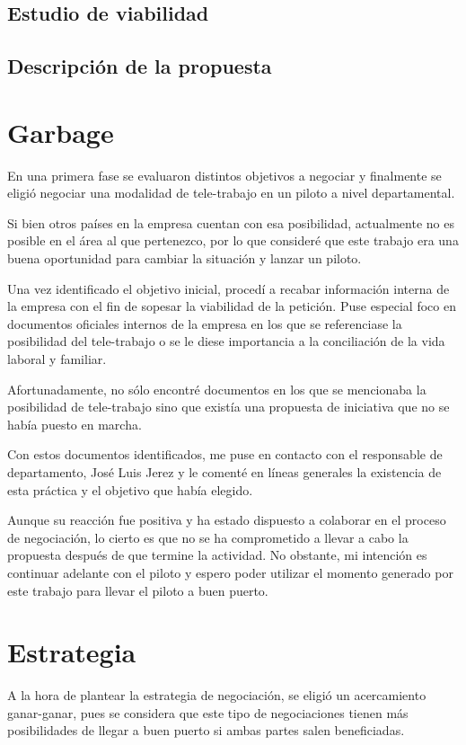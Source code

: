 \subsection{Estudio de viabilidad}
\shit

\subsection{Descripción de la propuesta}
\shit




\section{Garbage}
\par En una primera fase se evaluaron distintos objetivos a negociar y finalmente se eligió negociar una modalidad de tele-trabajo en un piloto a nivel departamental.
\par Si bien otros países en la empresa cuentan con esa posibilidad, actualmente no es posible en el área al que pertenezco, por lo que consideré que este trabajo
era una buena oportunidad para cambiar la situación y lanzar un piloto.
\par Una vez identificado el objetivo inicial, procedí a recabar información interna de la empresa con el fin de sopesar la viabilidad de la petición. Puse especial
foco en documentos oficiales internos de la empresa en los que se referenciase la posibilidad del tele-trabajo o se le diese importancia a la conciliación de la
vida laboral y familiar.
\par Afortunadamente, no sólo encontré documentos en los que se mencionaba la posibilidad de tele-trabajo sino que existía una propuesta de iniciativa que no se
había puesto en marcha.
\par Con estos documentos identificados, me puse en contacto con el responsable de departamento, José Luis Jerez y le comenté en líneas generales la existencia de
esta práctica y el objetivo que había elegido.
\par Aunque su reacción fue positiva y ha estado dispuesto a colaborar en el proceso de negociación, lo cierto es que no se ha comprometido a llevar a cabo la
propuesta después de que termine la actividad. No obstante, mi intención es continuar adelante con el piloto y espero poder utilizar el momento generado
por este trabajo para llevar el piloto a buen puerto.

\section{Estrategia}
\par A la hora de plantear la estrategia de negociación, se eligió un acercamiento ganar-ganar, pues se considera que este tipo de negociaciones tienen más posibilidades de llegar a buen puerto si ambas partes salen beneficiadas.
